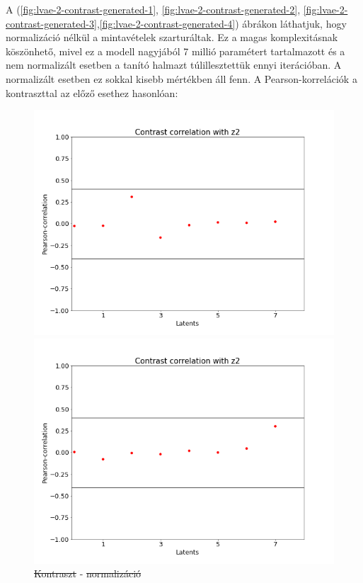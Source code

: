\documentclass[12pt, english]{article}
\begin{document}
\vspace{4mm}

\par A (\ref{fig:lvae-2-contrast-generated-1}, \ref{fig:lvae-2-contrast-generated-2}, \ref{fig:lvae-2-contrast-generated-3},\ref{fig:lvae-2-contrast-generated-4}) ábrákon láthatjuk, hogy normalizáció nélkül a mintavételek szarturáltak. Ez a magas komplexitásnak köszönhető, mivel ez a modell nagyjából 7 millió paramétert tartalmazott és a nem normalizált esetben a tanító halmazt túlillesztettük ennyi iterációban. A normalizált esetben ez sokkal kisebb mértékben áll fenn. A Pearson-korrelációk a kontraszttal az előző esethez hasonlóan:

\vspace{4mm}

\begin{figure}[H] 
  \label{fig:contrast-correlation} 
  \begin{minipage}{0.5\linewidth}
    \centering
    \includegraphics[width=.72\linewidth]{lvae2/21_DenseLadderVAE_noNorm-contrast-to-z2-corr.png} 
    \caption{\st{Kontraszt} - \st{normalizáció}} 
    \label{fig:lvae-2-no-contrast-no-norm}
  \end{minipage}%
  \begin{minipage}{0.5\linewidth}
    \centering
    \includegraphics[width=.72\linewidth]{lvae2/20_DenseLadderVAE_noNorm_contrat-contrast-to-z2-corr.png} 

\end{minipage}
\end{figure}
\end{document}
